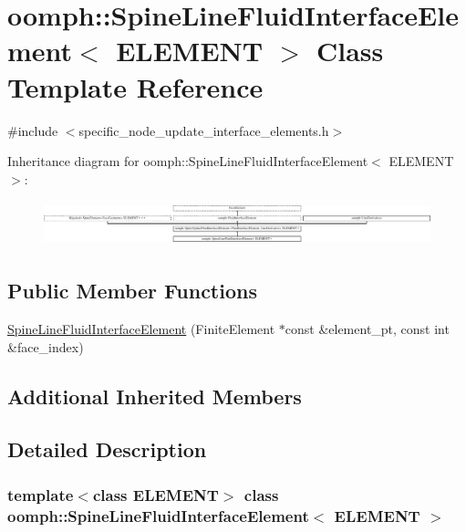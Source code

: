 \hypertarget{classoomph_1_1SpineLineFluidInterfaceElement}{}\section{oomph\+:\+:Spine\+Line\+Fluid\+Interface\+Element$<$ E\+L\+E\+M\+E\+NT $>$ Class Template Reference}
\label{classoomph_1_1SpineLineFluidInterfaceElement}


{\ttfamily \#include $<$specific\+\_\+node\+\_\+update\+\_\+interface\+\_\+elements.\+h$>$}

Inheritance diagram for oomph\+:\+:Spine\+Line\+Fluid\+Interface\+Element$<$ E\+L\+E\+M\+E\+NT $>$\+:\begin{figure}[H]
\begin{center}
\leavevmode
\includegraphics[height=1.319199cm]{classoomph_1_1SpineLineFluidInterfaceElement}
\end{center}
\end{figure}
\subsection*{Public Member Functions}
\begin{DoxyCompactItemize}
\item 
\hyperlink{classoomph_1_1SpineLineFluidInterfaceElement_aaafc180606b418920b0588532f8bfbec}{Spine\+Line\+Fluid\+Interface\+Element} (Finite\+Element $\ast$const \&element\+\_\+pt, const int \&face\+\_\+index)
\end{DoxyCompactItemize}
\subsection*{Additional Inherited Members}


\subsection{Detailed Description}
\subsubsection*{template$<$class E\+L\+E\+M\+E\+NT$>$\newline
class oomph\+::\+Spine\+Line\+Fluid\+Interface\+Element$<$ E\+L\+E\+M\+E\+N\+T $>$}




